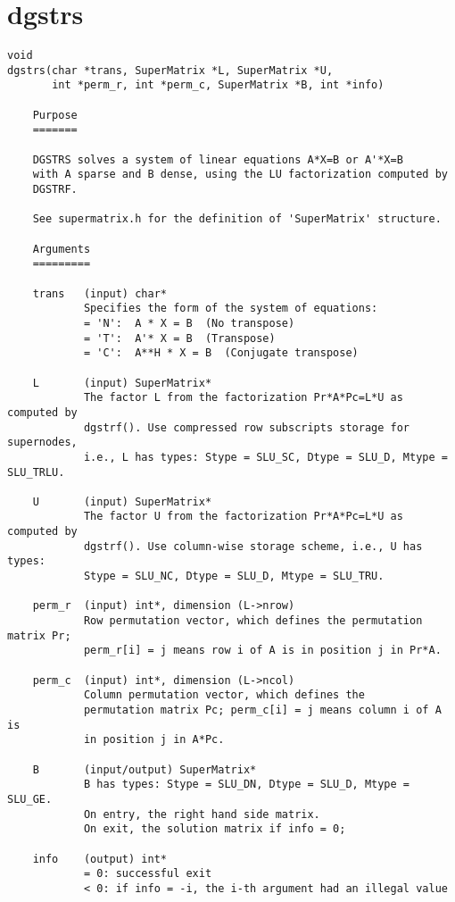 \section{dgstrs}
\begin{verbatim}
void
dgstrs(char *trans, SuperMatrix *L, SuperMatrix *U,
       int *perm_r, int *perm_c, SuperMatrix *B, int *info)

    Purpose
    =======
   
    DGSTRS solves a system of linear equations A*X=B or A'*X=B
    with A sparse and B dense, using the LU factorization computed by
    DGSTRF.
   
    See supermatrix.h for the definition of 'SuperMatrix' structure.
   
    Arguments
    =========
   
    trans   (input) char*
            Specifies the form of the system of equations:
            = 'N':  A * X = B  (No transpose)
            = 'T':  A'* X = B  (Transpose)
            = 'C':  A**H * X = B  (Conjugate transpose)
   
    L       (input) SuperMatrix*
            The factor L from the factorization Pr*A*Pc=L*U as computed by
            dgstrf(). Use compressed row subscripts storage for supernodes,
            i.e., L has types: Stype = SLU_SC, Dtype = SLU_D, Mtype = SLU_TRLU.
   
    U       (input) SuperMatrix*
            The factor U from the factorization Pr*A*Pc=L*U as computed by
            dgstrf(). Use column-wise storage scheme, i.e., U has types:
            Stype = SLU_NC, Dtype = SLU_D, Mtype = SLU_TRU.
   
    perm_r  (input) int*, dimension (L->nrow)
            Row permutation vector, which defines the permutation matrix Pr; 
            perm_r[i] = j means row i of A is in position j in Pr*A.
   
    perm_c  (input) int*, dimension (L->ncol)
            Column permutation vector, which defines the 
            permutation matrix Pc; perm_c[i] = j means column i of A is 
            in position j in A*Pc.
   
    B       (input/output) SuperMatrix*
            B has types: Stype = SLU_DN, Dtype = SLU_D, Mtype = SLU_GE.
            On entry, the right hand side matrix.
            On exit, the solution matrix if info = 0;
   
    info    (output) int*
            = 0: successful exit
            < 0: if info = -i, the i-th argument had an illegal value
   
\end{verbatim}


